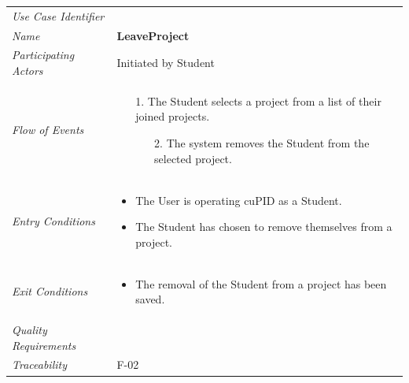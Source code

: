 \documentclass[12pt,letterpaper]{article}
\begin{document}
\begin{center}
	\begin{tabu} to 
		\toprule
		Use Case Identifier & \leaveproject{} \\
		Name & {\bf LeaveProject} \\
		Participating Actors & Initiated by Student \\
		Flow of Events & 
		\begin{minipage}[t]{\linewidth}
		    \begin{enumerate}
			    \item[1.] The Student selects a project from a list of their joined projects.
			    \begin{enumerate}
			    		\item[2.] The system removes the Student from the selected project.
			    \end{enumerate}
			\end{enumerate}
		\end{minipage} \\

		Entry Conditions &
		\begin{minipage}[t]{\linewidth}
			\begin{itemize}
			    \item The User is operating cuPID as a Student.
			    \item The Student has chosen to remove themselves from a project.
	        \end{itemize}
		\end{minipage} \\

		Exit Conditions &
		\begin{minipage}[t]{\linewidth}
			\begin{itemize}
			    \item The removal of the Student from a project has been saved.
	        \end{itemize}
		\end{minipage} \\

		Quality Requirements & \\

		Traceability & F-02 \\
		\toprule
	\end{tabu}
\end{center}
\end{document}
